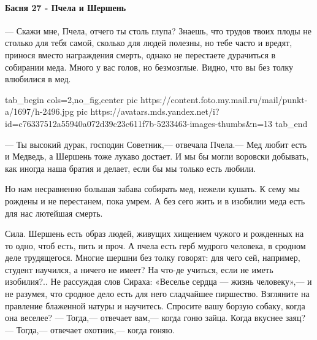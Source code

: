  
 
 
 
 

\paragraph{Басня 27 - Пчела и Шершень}
\label{sec:moje.kremlevskie_narrativy.jazyk.pchela_i_shershen}

— Скажи мне, Пчела, отчего ты столь глупа? Знаешь, что трудов твоих плоды не
столько для тебя самой, сколько для людей полезны, но тебе часто и вредят,
принося вместо награждения смерть, однако не перестаете дурачиться в собирании
меда. Много у вас голов, но безмозглые. Видно, что вы без толку влюбилися в
мед.

\ifcmt
  tab_begin cols=2,no_fig,center
     pic https://content.foto.my.mail.ru/mail/punkt-a/1697/h-2496.jpg
		 pic https://avatars.mds.yandex.net/i?id=c76337512a55940a072d39c23c611f7b-5233463-images-thumbs&n=13 
  tab_end
\fi

— Ты высокий дурак, господин Советник,— отвечала Пчела.— Мед любит есть и
Медведь, а Шершень тоже лукаво достает. И мы бы могли воровски добывать, как
иногда наша братия и делает, если бы мы только есть любили.

Но нам несравненно большая забава собирать мед, нежели кушать. К сему мы
рождены и не перестанем, пока умрем. А без сего жить и в изобилии меда есть для
нас лютейшая смерть.

Сила. Шершень есть образ людей, живущих хищением чужого и рожденных на то одно,
чтоб есть, пить и проч. А пчела есть герб мудрого человека, в сродном деле
трудящегося. Многие шершни без толку говорят: для чего сей, например, студент
научился, а ничего не имеет? На что-де учиться, если не иметь изобилия?.. Не
рассуждая слов Сираха: «Веселье сердца — жизнь человеку»,— и не разумея, что
сродное дело есть для него сладчайшее пиршество. Взгляните на правление
блаженной натуры и научитесь. Спросите вашу борзую собаку, когда она веселее? —
Тогда,— отвечает вам,— когда гоню зайца. Когда вкуснее заяц? — Тогда,— отвечает
охотник,— когда гоняю.

